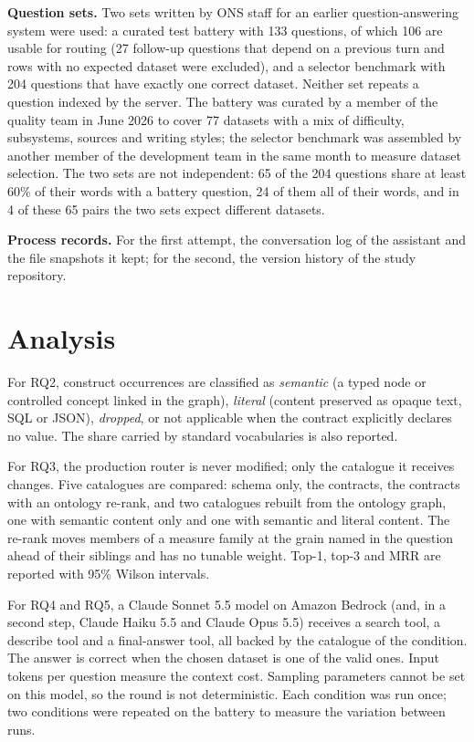 \textbf{Question sets.} Two sets written by ONS staff for an earlier question-answering
system were used: a curated test battery with 133 questions, of which 106 are usable for
routing (27 follow-up questions that depend on a previous turn and rows with no expected
dataset were excluded), and a selector benchmark with 204 questions that have exactly one
correct dataset. Neither set repeats a question indexed by the server. The battery was
curated by a member of the quality team in June 2026 to cover 77 datasets with a mix of
difficulty, subsystems, sources and writing styles; the selector benchmark was assembled by
another member of the development team in the same month to measure dataset selection. The
two sets are not independent: 65 of the 204 questions share at least 60\% of their words
with a battery question, 24 of them all of their words, and in 4 of these 65 pairs the two
sets expect different datasets. 

\textbf{Process records.} For the first attempt, the conversation log of the assistant and
the file snapshots it kept; for the second, the version history of the study repository.

\section{Analysis}
For RQ2, construct occurrences are classified as \emph{semantic} (a typed node or controlled
concept linked in the graph), \emph{literal} (content preserved as opaque text, SQL or JSON),
\emph{dropped}, or not applicable when the contract explicitly declares no value. The share
carried by standard vocabularies is also reported.

For RQ3, the production router is never modified; only the catalogue it receives changes.
Five catalogues are compared: schema only, the contracts, the contracts with an ontology
re-rank, and two catalogues rebuilt from the ontology graph, one with semantic content only
and one with semantic and literal content. The re-rank moves members of a measure family at
the grain named in the question ahead of their siblings and has no tunable weight. Top-1,
top-3 and MRR are reported with 95\% Wilson intervals.

For RQ4 and RQ5, a Claude Sonnet 5.5 model on Amazon Bedrock (and, in a second step, Claude Haiku 5.5 and Claude Opus 5.5) receives a search tool, a
describe tool and a final-answer tool, all backed by the catalogue of the condition. The
answer is correct when the chosen dataset is one of the valid ones. Input tokens per
question measure the context cost. Sampling parameters cannot be set on this model, so the
round is not deterministic. Each condition was run once; two conditions were repeated on the
battery to measure the variation between runs.

